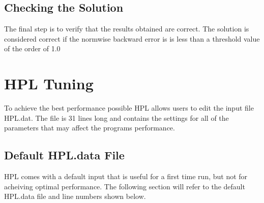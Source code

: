 \documentclass[a4paper, 11pt]{article}
\begin{document}
\subsection{Checking the Solution}
The final step is to verify that the results obtained are correct. The solution is considered correct if the normwise backward error is is less than a threshold value of the order of 1.0

\pagebreak

\section{HPL Tuning}
To achieve the best performance possible HPL allows users to edit the input file HPL.dat. The file is 31 lines long and contains the settings for all of the parameters that may affect the programs performance. 

\subsection{Default HPL.data File}
HPL comes with a default input that is useful for a first time run, but not for acheiving optimal performance. The following section will refer to the default HPL.data file and line numbers shown below.\cite{website:tuning}

\
\end{document}

